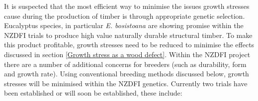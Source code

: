 It is suspected that the most efficient way to minimise the issues growth
stresses cause during the production of timber is through appropriate genetic
selection. Eucalyptus species, in particular \textit{E. bosistoana} are showing
promise within the NZDFI trials to produce high value naturally durable
structural timber. To make this
product profitable, growth stresses need to be reduced to minimise the effects
discussed in section \ref{Growth stress as a wood defect}. Within the NZDFI project there are a number of
additional concerns for breeders (such as durability, form and growth rate). Using conventional breeding methods
discussed below, growth stresses will be minimised within the NZDFI genetics.
Currently two trials have been established or will soon be established, these
include: